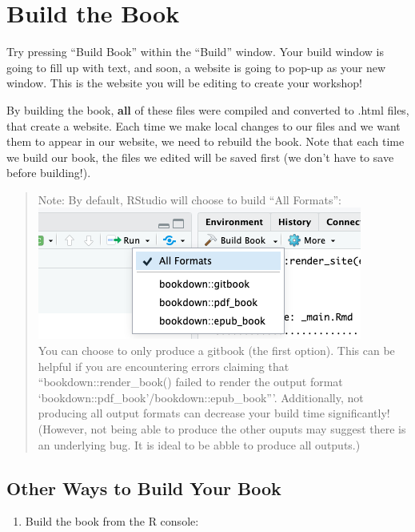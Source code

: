 \documentclass[
]{book}
\providecommand{\tightlist}{%
  \setlength{\itemsep}{0pt}\setlength{\parskip}{0pt}}
\theoremstyle{definition}
\theoremstyle{definition}
\theoremstyle{definition}
\theoremstyle{definition}
\theoremstyle{remark}
\begin{document}
\section{Build the Book}\label{build-the-book}

Try pressing ``Build Book'' within the ``Build'' window. Your build window is going to fill up with text, and soon, a website is going to pop-up as your new window. This is the website you will be editing to create your workshop!

By building the book, \textbf{all} of these files were compiled and converted to .html files, that create a website. Each time we make local changes to our files and we want them to appear in our website, we need to rebuild the book. Note that each time we build our book, the files we edited will be saved first (we don't have to save before building!).

\begin{quote}
Note: By default, RStudio will choose to build ``All Formats'':
\includegraphics{img/files-and-build/build-book-options.png}\\
You can choose to only produce a gitbook (the first option). This can be helpful if you are encountering errors claiming that ``bookdown::render\_book() failed to render the output format `bookdown::pdf\_book'/bookdown::epub\_book'''. Additionally, not producing all output formats can decrease your build time significantly! (However, not being able to produce the other ouputs may suggest there is an underlying bug. It is ideal to be abble to produce all outputs.)
\end{quote}

\subsection{Other Ways to Build Your Book}\label{other-ways-to-build-your-book}

\begin{enumerate}
\def\labelenumi{\arabic{enumi}.}
\tightlist
\item
  Build the book from the R console:
\end{enumerate}
\end{document}
